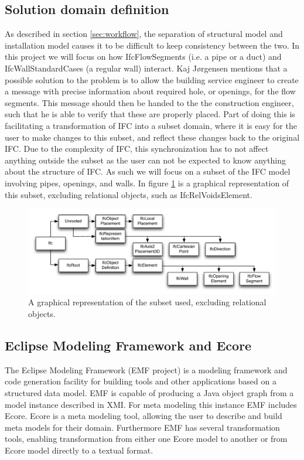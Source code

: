 \subsection{Solution domain definition}
\label{sec:solution_domain_definition}
As described in section \ref{sec:workflow}, the separation of structural model and installation model causes it to be difficult to keep consistency between the two. In this project we will focus on how IfcFlowSegments (i.e. a pipe or a duct) and IfcWallStandardCases (a regular wall) interact. Kaj J\o rgensen mentions that a possible solution to the problem is to allow the building service engineer to create a message with precise information about required hole, or openings, for the flow segments. This message should then be handed to the the construction engineer, such that he is able to verify that these are properly placed. Part of doing this is facilitating a transformation of IFC into a subset domain, where it is easy for the user to make changes to this subset, and reflect these changes back to the original IFC. Due to the complexity of IFC, this synchronization has to not affect anything outside the subset as the user can not be expected to know anything about the structure of IFC. As such we will focus on a subset of the IFC model involving pipes, openings, and walls. In figure \ref{fig:ifcheirachy} is a graphical representation of this subset, excluding relational objects, such as IfcRelVoidsElement.

\begin{figure}[htbp]
    \centering
        \includegraphics[width=120mm]{images/IfcHeirachy.pdf}
    \caption{A graphical representation of the subset used, excluding relational objects.}
    \label{fig:ifcheirachy}
\end{figure}

\subsection{Eclipse Modeling Framework and Ecore}
The Eclipse Modeling Framework (EMF project) is a modeling framework and code generation facility for building tools and other applications based on a structured data model\cite{emf}. EMF is capable of producing a Java object graph from a model instance described in XMI. For meta modeling this instance EMF includes Ecore. Ecore is a meta modeling tool, allowing the user to describe and build meta models for their domain. Furthermore EMF has several transformation tools, enabling transformation from either one Ecore model to another or from Ecore model directly to a textual format.

